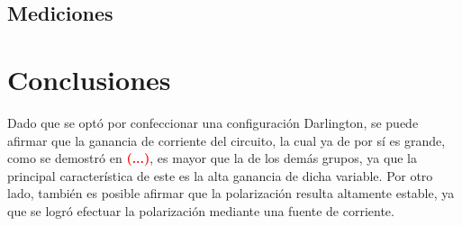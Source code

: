\subsection{Mediciones}

\section{Conclusiones}
Dado que se optó por confeccionar una configuración Darlington, se puede afirmar que la ganancia de corriente del circuito, la cual ya de por sí es grande, como se demostró en \textcolor{red}{\textbf{(...)}}, es mayor que la de los demás grupos, ya que la principal característica de este es la alta ganancia de dicha variable. Por otro lado, también es posible afirmar que la polarización resulta altamente estable, ya que se logró efectuar la polarización mediante una fuente de corriente.
	
